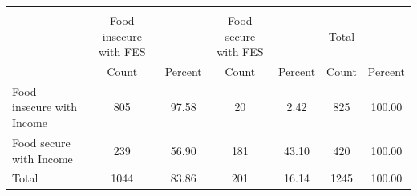 {
\def\sym#1{\ifmmode^{#1}\else\(^{#1}\)\fi}
\begin{tabular}{l*{3}{cc}}
\hline\hline
            &\multicolumn{6}{c}{}                                                                           \\
            &Food insecure with FES&               &Food secure with FES&               &          Total&               \\
            &          Count&        Percent&          Count&        Percent&          Count&        Percent\\
\hline
Food insecure with Income&            805&          97.58&             20&           2.42&            825&         100.00\\
Food secure with Income&            239&          56.90&            181&          43.10&            420&         100.00\\
Total       &           1044&          83.86&            201&          16.14&           1245&         100.00\\
\hline\hline
\end{tabular}
}
